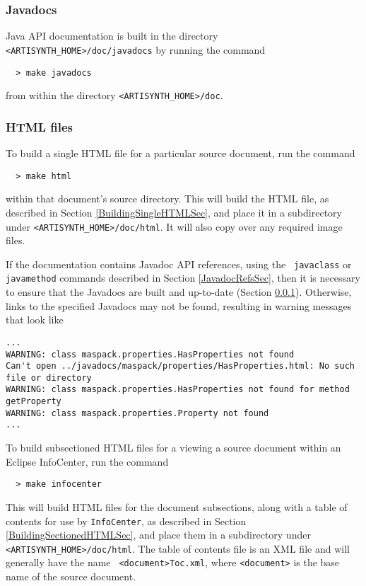 \documentclass{article}
\begin{document}
\subsubsection{Javadocs}
\label{MakingJavadocsSec}

Java API documentation is built in the directory {\tt
<ARTISYNTH\_HOME>/doc/javadocs} by running the command
%
\begin{verbatim}
  > make javadocs
\end{verbatim}
%
from within the directory {\tt <ARTISYNTH\_HOME>/doc}.

\subsubsection{HTML files}
\label{MakingHTMLSec}

To build a single HTML file for a particular source document,
run the command
%
\begin{verbatim}
  > make html
\end{verbatim}
%
within that document's source directory. This will build the HTML
file, as described in Section \ref{BuildingSingleHTMLSec}, and place it
in a subdirectory under {\tt <ARTISYNTH\_HOME>/doc/html}. It will also
copy over any required image files.

\begin{sideblock}
If the documentation contains Javadoc API references, using the {\tt
\BKS javaclass} or {\tt \BKS javamethod} commands described in Section
\ref{JavadocRefsSec}, then it is necessary to ensure that the Javadocs
are built and up-to-date (Section
\ref{MakingJavadocsSec}). Otherwise, links to the specified Javadocs
may not be found, resulting in warning messages that look like
%
\begin{verbatim}
...
WARNING: class maspack.properties.HasProperties not found
Can't open ../javadocs/maspack/properties/HasProperties.html: No such file or directory
WARNING: class maspack.properties.HasProperties not found for method getProperty
WARNING: class maspack.properties.Property not found
...
\end{verbatim}
%
\end{sideblock}

To build subsectioned HTML files for a viewing a source document
within an Eclipse InfoCenter, run the command
%
\begin{verbatim}
  > make infocenter
\end{verbatim}
%
This will build HTML files for the document subsections, along with
a table of contents for use by {\tt InfoCenter}, as described
in Section \ref{BuildingSectionedHTMLSec},
and place them in
a subdirectory under {\tt <ARTISYNTH\_HOME>/doc/html}.  The table of
contents file is an XML file and will generally have the name {\tt
<document>Toc.xml}, where {\tt <document>} is the base name of the
source document.
\end{document}

